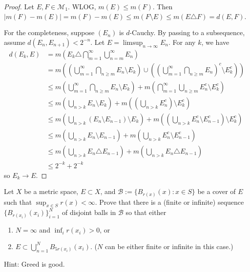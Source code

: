 \documentclass{article}
\begin{document}
\begin{proof}
Let $E,F \in \mathcal M_1$. WLOG, $m(E) \le m(F)$. Then $|m(F) - m(E)| = m(F) - m(E) \le m(F\setminus E) \le m(E \triangle F) = d(E,F)$.

For the completeness, suppose $(E_n)$ is $d$-Cauchy. By passing to a subsequence, assume $d(E_n, E_{n+1}) < 2^{-n}$. Let $E = \limsup_{n\rightarrow \infty} E_n$.  For any $k$, we have 
\begin{align*}
d(E_k, E) & = m(E_k \triangle \bigcap_{m=1}^\infty\bigcup_{n=m}^\infty E_n)
\\ & = m((\bigcup_{m=1}^\infty\bigcap_{n \ge m} E_n \setminus E_k) \cup ((\bigcup_{m=1}^\infty\bigcap_{n \ge m} E_n )^c \setminus E_k^c) )
\\ & \le m(\bigcup_{m=1}^\infty\bigcap_{n \ge m} E_n \setminus E_k) + m(\bigcap_{m=1}^\infty\bigcup_{n \ge m} E_n^c  \setminus E_k^c )
\\ & \le m(\bigcup_{n > k} E_n \setminus E_k) + m((\bigcup_{n > k} E_n^c) \setminus E_k^c )
\\ & \le m(\bigcup_{n > k} (E_n \setminus E_{n-1}) \setminus E_k) + m((\bigcup_{n > k} E_n^c \setminus E_{n-1}^c) \setminus E_k^c )
\\ & \le m(\bigcup_{n > k} E_n \setminus E_{n-1}) + m(\bigcup_{n > k} E_n^c \setminus E_{n-1}^c)
\\ & \le m(\bigcup_{n > k} E_n \triangle E_{n-1}) + m(\bigcup_{n > k} E_n \triangle E_{n-1})
\\ & \le 2^{-k} + 2^{-k}
\end{align*}
so $E_k \rightarrow E$.

\end{proof}
 Let $X$ be a metric space, $E\subset X$, and $\mathcal B := \{B_{r(x)}(x) : x \in S \}$ be a cover of $E$ such that $\sup_{x\in S} r(x) < \infty$. Prove that there is a (finite or infinite) sequence $\{B_{r(x_i)}(x_i)\}_{i=1}^N$ of disjoint balls in $\mathcal B$ so that either
\begin{enumerate}
\item $N = \infty$ and $\inf_i r(x_i) > 0$, or
\item $E \subset \bigcup_{n=1}^N B_{5r(x_i)}(x_i)$. ($N$ can be either finite or infinite in this case.)
\end{enumerate}
Hint: Greed is good.
\end{document}

